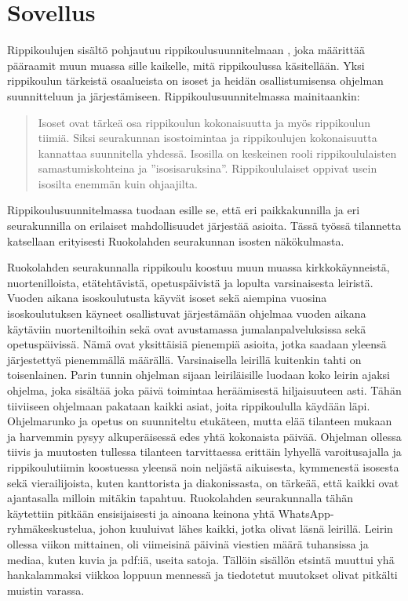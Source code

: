 \chapter{Sovellus}
\label{ch:sovellus}

Rippikoulujen sisältö pohjautuu rippikoulusuunnitelmaan
\parencite{evlSuuriIhmeRippikoulusuunnitelma2017}, joka määrittää pääraamit
muun muassa sille kaikelle, mitä rippikoulussa käsitellään. Yksi rippikoulun
tärkeistä osaalueista on isoset ja heidän osallistumisensa ohjelman
suunnitteluun ja järjestämiseen. Rippikoulusuunnitelmassa
\parencite{evlSuuriIhmeRippikoulusuunnitelma2017} mainitaankin:

\begin{quotation}
    \noindent Isoset ovat tärkeä osa rippikoulun kokonaisuutta ja myös
    rippikoulun tiimiä. Siksi seurakunnan isostoimintaa ja rippikoulujen
    kokonaisuutta kannattaa suunnitella yhdessä. Isosilla on keskeinen rooli
    rippikoululaisten samastumiskohteina ja ”isosisaruksina”. Rippikoululaiset
    oppivat usein isosilta enemmän kuin ohjaajilta.
\end{quotation}

Rippikoulusuunnitelmassa tuodaan esille se, että eri paikkakunnilla ja eri
seurakunnilla on erilaiset mahdollisuudet järjestää asioita. Tässä työssä
tilannetta katsellaan erityisesti Ruokolahden seurakunnan isosten näkökulmasta.

Ruokolahden seurakunnalla rippikoulu koostuu muun muassa kirkkokäynneistä,
nuortenilloista, etätehtävistä, opetuspäivistä ja lopulta varsinaisesta
leiristä. Vuoden aikana isoskoulutusta käyvät isoset sekä aiempina vuosina
isoskoulutuksen käyneet osallistuvat järjestämään ohjelmaa vuoden aikana
käytäviin nuorteniltoihin sekä ovat avustamassa jumalanpalveluksissa sekä
opetuspäivissä. Nämä ovat yksittäisiä pienempiä asioita, jotka saadaan
yleensä järjestettyä pienemmällä määrällä. Varsinaisella leirillä kuitenkin
tahti on toisenlainen. Parin tunnin ohjelman sijaan leiriläisille luodaan koko
leirin ajaksi ohjelma, joka sisältää joka päivä toimintaa heräämisestä
hiljaisuuteen asti. Tähän tiiviiseen ohjelmaan pakataan kaikki asiat, joita
rippikoululla käydään läpi. Ohjelmarunko ja opetus on suunniteltu etukäteen,
mutta elää tilanteen mukaan ja harvemmin pysyy alkuperäisessä edes yhtä
kokonaista päivää. Ohjelman ollessa tiivis ja muutosten tullessa tilanteen
tarvittaessa erittäin lyhyellä varoitusajalla ja rippikoulutiimin koostuessa
yleensä noin neljästä aikuisesta, kymmenestä isosesta sekä vierailijoista,
kuten kanttorista ja diakonissasta, on tärkeää, että kaikki ovat ajantasalla
milloin mitäkin tapahtuu. Ruokolahden seurakunnalla tähän käytettiin pitkään
ensisijaisesti ja ainoana keinona yhtä WhatsApp-ryhmäkeskustelua, johon
kuuluivat lähes kaikki, jotka olivat läsnä leirillä. Leirin ollessa viikon
mittainen, oli viimeisinä päivinä viestien määrä tuhansissa ja mediaa, kuten
kuvia ja pdf:iä, useita satoja. Tällöin sisällön etsintä muuttui yhä
hankalammaksi viikkoa loppuun mennessä ja tiedotetut muutokset olivat pitkälti
muistin varassa.

